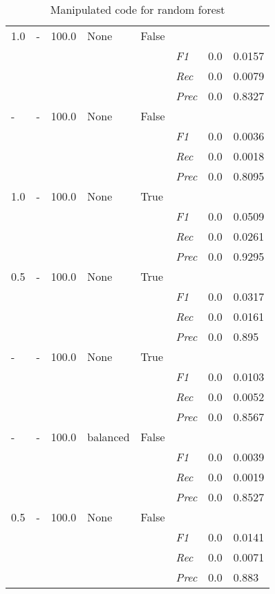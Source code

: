 \begin{table}[]
\begin{tabularx}{\textwidth}{XXXXX|X|X|X}
1.0 & - & 100.0 & None & False & &  \\
& & & & & \textit{F1} & 0.0 & 0.0157        \\
& & & & & \textit{Rec} &  0.0 & 0.0079    \\
& & & & & \textit{Prec} & 0.0 & 0.8327  \\ \midrule
- & - & 100.0 & None & False & &  \\
& & & & & \textit{F1} & 0.0 & 0.0036        \\
& & & & & \textit{Rec} &  0.0 & 0.0018    \\
& & & & & \textit{Prec} & 0.0 & 0.8095  \\ \midrule
1.0 & - & 100.0 & None & True & &  \\
& & & & & \textit{F1} & 0.0 & 0.0509        \\
& & & & & \textit{Rec} &  0.0 & 0.0261    \\
& & & & & \textit{Prec} & 0.0 & 0.9295  \\ \midrule
0.5 & - & 100.0 & None & True & &  \\
& & & & & \textit{F1} & 0.0 & 0.0317        \\
& & & & & \textit{Rec} &  0.0 & 0.0161    \\
& & & & & \textit{Prec} & 0.0 & 0.895  \\ \midrule
- & - & 100.0 & None & True & &  \\
& & & & & \textit{F1} & 0.0 & 0.0103        \\
& & & & & \textit{Rec} &  0.0 & 0.0052    \\
& & & & & \textit{Prec} & 0.0 & 0.8567  \\ \midrule
- & - & 100.0 & balanced & False & &  \\
& & & & & \textit{F1} & 0.0 & 0.0039        \\
& & & & & \textit{Rec} &  0.0 & 0.0019    \\
& & & & & \textit{Prec} & 0.0 & 0.8527  \\ \midrule
0.5 & - & 100.0 & None & False & &  \\
& & & & & \textit{F1} & 0.0 & 0.0141        \\
& & & & & \textit{Rec} &  0.0 & 0.0071    \\
& & & & & \textit{Prec} & 0.0 & 0.883  \\ \midrule
\end{tabularx}
\caption{Manipulated code for random forest}
\label{tab:rq3_random_forest}
\end{table}

